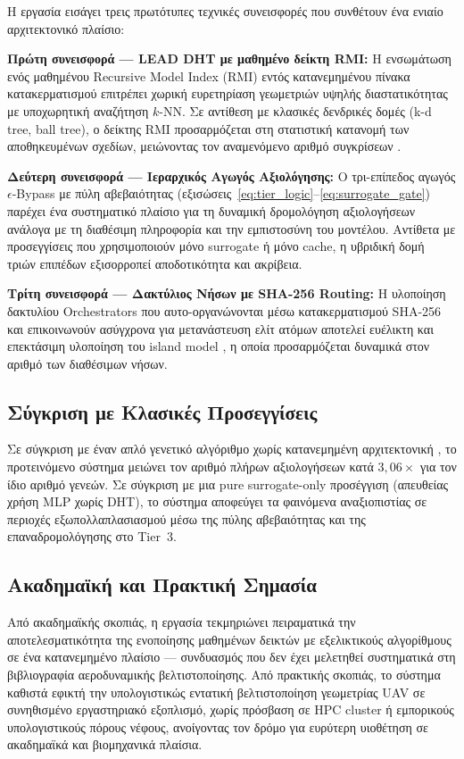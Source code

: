Η εργασία εισάγει τρεις πρωτότυπες τεχνικές συνεισφορές που συνθέτουν ένα ενιαίο αρχιτεκτονικό πλαίσιο:

\textbf{Πρώτη συνεισφορά — LEAD DHT με μαθημένο δείκτη RMI:} Η ενσωμάτωση ενός μαθημένου Recursive Model Index (RMI) εντός κατανεμημένου πίνακα κατακερματισμού επιτρέπει χωρική ευρετηρίαση γεωμετριών υψηλής διαστατικότητας με υποχωρητική αναζήτηση $k$-NN. Σε αντίθεση με κλασικές δενδρικές δομές (k-d tree, ball tree), ο δείκτης RMI προσαρμόζεται στη στατιστική κατανομή των αποθηκευμένων σχεδίων, μειώνοντας τον αναμενόμενο αριθμό συγκρίσεων \cite{wang2025lead, kraska2018case}.

\textbf{Δεύτερη συνεισφορά — Ιεραρχικός Αγωγός Αξιολόγησης:} Ο τρι-επίπεδος αγωγός $\epsilon$-Bypass με πύλη αβεβαιότητας (εξισώσεις~\ref{eq:tier_logic}--\ref{eq:surrogate_gate}) παρέχει ένα συστηματικό πλαίσιο για τη δυναμική δρομολόγηση αξιολογήσεων ανάλογα με τη διαθέσιμη πληροφορία και την εμπιστοσύνη του μοντέλου. Αντίθετα με προσεγγίσεις που χρησιμοποιούν μόνο surrogate \cite{jin2002framework} ή μόνο cache, η υβριδική δομή τριών επιπέδων εξισορροπεί αποδοτικότητα και ακρίβεια.

\textbf{Τρίτη συνεισφορά — Δακτύλιος Νήσων με SHA-256 Routing:} Η υλοποίηση δακτυλίου Orchestrators που αυτο-οργανώνονται μέσω κατακερματισμού SHA-256 και επικοινωνούν ασύγχρονα για μετανάστευση ελίτ ατόμων αποτελεί ευέλικτη και επεκτάσιμη υλοποίηση του island model \cite{whitley1999island}, η οποία προσαρμόζεται δυναμικά στον αριθμό των διαθέσιμων νήσων.

\subsection*{Σύγκριση με Κλασικές Προσεγγίσεις}

Σε σύγκριση με έναν απλό γενετικό αλγόριθμο χωρίς κατανεμημένη αρχιτεκτονική \cite{goldberg1989genetic}, το προτεινόμενο σύστημα μειώνει τον αριθμό πλήρων αξιολογήσεων κατά $3{,}06\times$ για τον ίδιο αριθμό γενεών. Σε σύγκριση με μια pure surrogate-only προσέγγιση (απευθείας χρήση MLP χωρίς DHT), το σύστημα αποφεύγει τα φαινόμενα αναξιοπιστίας σε περιοχές εξωπολλαπλασιασμού μέσω της πύλης αβεβαιότητας και της επαναδρομολόγησης στο Tier~3.

\subsection*{Ακαδημαϊκή και Πρακτική Σημασία}

Από ακαδημαϊκής σκοπιάς, η εργασία τεκμηριώνει πειραματικά την αποτελεσματικότητα της ενοποίησης μαθημένων δεικτών με εξελικτικούς αλγορίθμους σε ένα κατανεμημένο πλαίσιο — συνδυασμός που δεν έχει μελετηθεί συστηματικά στη βιβλιογραφία αεροδυναμικής βελτιστοποίησης. Από πρακτικής σκοπιάς, το σύστημα καθιστά εφικτή την υπολογιστικώς εντατική βελτιστοποίηση γεωμετρίας UAV σε συνηθισμένο εργαστηριακό εξοπλισμό, χωρίς πρόσβαση σε HPC cluster ή εμπορικούς υπολογιστικούς πόρους νέφους, ανοίγοντας τον δρόμο για ευρύτερη υιοθέτηση σε ακαδημαϊκά και βιομηχανικά πλαίσια.
